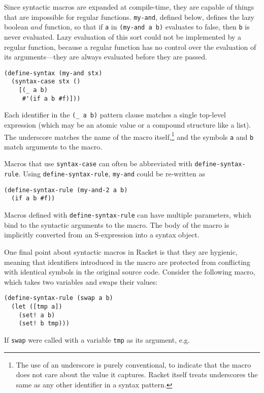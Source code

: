 \documentclass{article}
\begin{document}
Since syntactic macros are expanded at compile-time, they are capable of things that are impossible for regular functions. \texttt{my-and}, defined below, defines the lazy boolean $and$ function, so that if \texttt{a} in \texttt{(my-and a b)} evaluates to false, then \texttt{b} is never evaluated. Lazy evaluation of this sort could not be implemented by a regular function, because a regular function has no control over the evaluation of its arguments---they are always evaluated before they are passed.

\begin{lstlisting}
(define-syntax (my-and stx)
  (syntax-case stx ()
    [(_ a b)
     #'(if a b #f)]))
\end{lstlisting}

Each identifier in the \texttt{(\_ a b)} pattern clause matches a single top-level expression (which may be an atomic value or a compound structure like a list). The underscore matches the name of the macro itself,\footnote{The use of an underscore is purely conventional, to indicate that the macro does not care about the value it captures. Racket itself treats underscores the same as any other identifier in a syntax pattern.} and the symbols \texttt{a} and \texttt{b} match arguments to the macro.

Macros that use \texttt{syntax-case} can often be abbreviated with \texttt{define-syntax-rule}. Using \texttt{define-syntax-rule}, \texttt{my-and} could be re-written as

\begin{lstlisting}
(define-syntax-rule (my-and-2 a b)
  (if a b #f))
\end{lstlisting}

Macros defined with \texttt{define-syntax-rule} can have multiple parameters, which bind to the syntactic arguments to the macro. The body of the macro is implicitly converted from an S-expression into a syntax object.

One final point about syntactic macros in Racket is that they are hygienic, meaning that identifiers introduced in the macro are protected from conflicting with identical symbols in the original source code. Consider the following macro, which takes two variables and swaps their values:

\begin{lstlisting}
(define-syntax-rule (swap a b)
  (let ([tmp a])
    (set! a b)
    (set! b tmp)))
\end{lstlisting}

If \texttt{swap} were called with a variable \texttt{tmp} as its argument, e.g.
\end{document}
